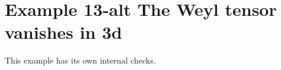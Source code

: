 \documentclass[12pt]{cdblatex}
\begin{document}
\section*{Example 13-alt The Weyl tensor vanishes in 3d}

This example has its own internal checks.
\end{document}
